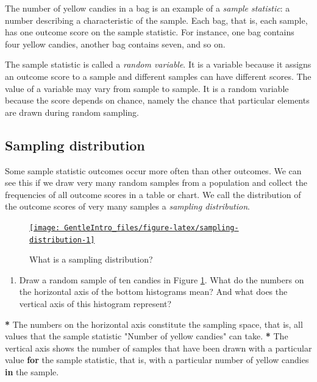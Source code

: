 \documentclass[a4paper]{book}
\newenvironment{Shaded}{\begin{snugshade}}{\end{snugshade}}
\newcommand{\StringTok}[1]{\textcolor[rgb]{0.00,0.00,0.00}{#1}}
\newcommand{\ControlFlowTok}[1]{\textcolor[rgb]{0.00,0.00,0.00}{\textbf{#1}}}
\newcommand{\OperatorTok}[1]{\textcolor[rgb]{0.00,0.00,0.00}{\textbf{#1}}}
\newcommand{\NormalTok}[1]{#1}
\providecommand{\tightlist}{%
  \setlength{\itemsep}{0pt}\setlength{\parskip}{0pt}}
\theoremstyle{definition}
\theoremstyle{definition}
\theoremstyle{definition}
\theoremstyle{remark}
\begin{document}
The number of yellow candies in a bag is an example of a \emph{sample
statistic}: a number describing a characteristic of the sample. Each
bag, that is, each sample, has one outcome score on the sample
statistic. For instance, one bag contains four yellow candies, another
bag contains seven, and so on.

The sample statistic is called a \emph{random variable}. It is a
variable because it assigns an outcome score to a sample and different
samples can have different scores. The value of a variable may vary from
sample to sample. It is a random variable because the score depends on
chance, namely the chance that particular elements are drawn during
random sampling.

\subsection{Sampling distribution}\label{sampling-distribution}

Some sample statistic outcomes occur more often than other outcomes. We
can see this if we draw very many random samples from a population and
collect the frequencies of all outcome scores in a table or chart. We
call the distribution of the outcome scores of very many samples a
\emph{sampling distribution}.

\begin{figure}[H]
\href{http://82.196.4.233:3838/apps/sampling-distribution/}{\texttt{[image: GentleIntro\_files/figure-latex/sampling-distribution-1]} }\caption{What is a sampling distribution?}\label{fig:sampling-distribution}
\end{figure}

\begin{enumerate}
\def\labelenumi{\arabic{enumi}.}
\tightlist
\item
  Draw a random sample of ten candies in Figure
  \ref{fig:sampling-distribution}. What do the numbers on the horizontal
  axis of the bottom histograms mean? And what does the vertical axis of
  this histogram represent?
\end{enumerate}

\begin{Shaded}
\begin{Highlighting}[]
\OperatorTok{*}\StringTok{ }\NormalTok{The numbers on the horizontal axis constitute the sampling space, that is, all}
\NormalTok{values that the sample statistic }\StringTok{"Number of yellow candies"}\NormalTok{ can take.}
\OperatorTok{*}\StringTok{ }\NormalTok{The vertical axis shows the number of samples that have been drawn with a}
\NormalTok{particular value }\ControlFlowTok{for}\NormalTok{ the sample statistic, that is, with a particular number}
\NormalTok{of yellow candies }\ControlFlowTok{in}\NormalTok{ the sample.}
\end{Highlighting}
\end{Shaded}
\end{document}
